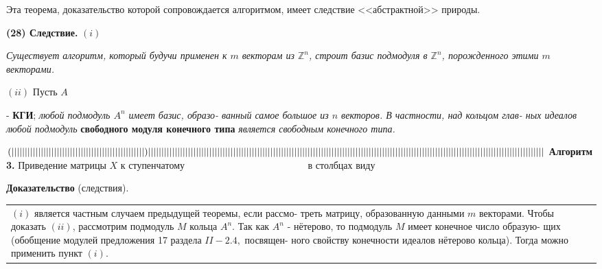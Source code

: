 \documentclass{mai_book}
\begin{document}
	Эта теорема, доказательство которой сопровождается алгоритмом,\linebreak
	имеет следствие <<абстрактной>> природы.
	
	\noindent
	{\bf (28) Следствие.}
	$(i)$ {\it Существует алгоритм, который будучи применен к $m$ векторам\linebreak
	из ${\mathbb Z}^{n}$, строит базис подмодуля в ${\mathbb Z}^{n}$, порожденного этими $m$ векторами.
	
	$(ii)$ Пусть $A$ }- {\bf КГИ}; {\it любой подмодуль $A^{n}$ имеет базис, образо-\linebreak
	ванный самое большое из $n$ векторов. В частности, над кольцом глав-\linebreak
	ных идеалов любой подмодуль} {\bf свободного модуля конечного типа}\linebreak
	{\it является свободным конечного типа.}
	
	$(||||||||||\linebreak||||||||||||\linebreak|||||||||||||||||||\linebreak|||||||||)
	|||||||||\linebreak||||||||||||||||\linebreak||||||||||||||||||||||\linebreak||||||||||||||||\linebreak||||||||||
	||||||||||||||||||||\linebreak|||||||||||||||\linebreak|||||||||||||||\linebreak|||||||||||||\linebreak|||||||||||||$\linebreak
	{\bf Алгоритм 3.} Приведение матрицы $X$ к ступенчатому\linebreak
	${\ \ \ \ \ \ \ \ \ \ \ \ \ \ \ \ \ \ \ \ \ \ \ \ \ \ \ \ \ \ \ \ \ \ \ \ \ \ \ \ \ \ \ \ \ \ \ \ \ \ \ \ \ \ \ }$ в столбцах виду 
	
	\pagebreak
	
	
	\noindent
	{\bf Доказательство} (следствия).

	\begin{tabular}{|p{12.5cm}}
	$(i)$ является частным случаем предыдущей теоремы, если рассмо-\linebreak
	треть матрицу, образованную данными $m$ векторами.\linebreak
	Чтобы доказать $(ii)$, рассмотрим подмодуль $M$ кольца $A^n$. Так как\linebreak
	$A^{n}$ - нётерово, то подмодуль $M$ имеет конечное число образую-\linebreak
	щих (обобщение модулей предложения 17 раздела $II-2.4,$ посвящен-\linebreak
	ного свойству конечности идеалов нётерово кольца). Тогда можно\linebreak
	применить пункт $(i)$.
	\end{tabular}
	
\end{document}
